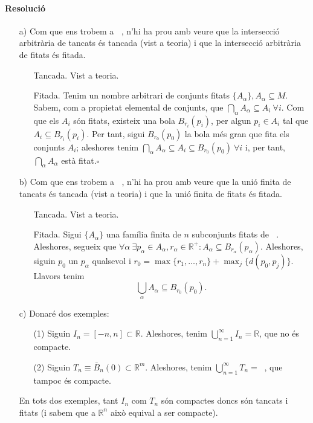 \documentclass[11pt]{article}
\DeclareMathOperator{\Rn}{\mathbb{R}^n}
\DeclareMathOperator{\Rm}{\mathbb{R}^m}
\DeclareMathOperator{\maxi}{max}
\begin{document}
\paragraph{Resolució}
\begin{itemize}
	\item[a)] Com que ens trobem a $\Rn$, n'hi ha prou amb veure que la intersecció arbitrària de tancats és tancada (vist a teoria) i que la intersecció arbitrària de fitats és fitada.
	\begin{itemize}
		\item[Tancada.] Vist a teoria.
		\item[Fitada.] Tenim un nombre arbitrari de conjunts fitats $\{A_{\alpha}\},A_{\alpha}\subseteq M$. Sabem, com a propietat elemental de conjunts, que $\bigcap_{\alpha}A_{\alpha}\subseteq A_i\ \forall i.$ Com que els $A_i$ són fitats, existeix una bola $B_{r_i}(p_i)$, per algun $p_i\in A_i$ tal que $A_i\subseteq B_{r_i}(p_i)$. Per tant, sigui $B_{r_0}(p_0)$ la bola més gran que fita els conjunts $A_i$; aleshores tenim $\bigcap_{\alpha}A_{\alpha}\subseteq A_i\subseteq B_{r_0}(p_0)\ \forall i$ i, per tant, $\bigcap_{\alpha}A_{\alpha}$ està fitat.$\square$
	\end{itemize}
	\item[b)] Com que ens trobem a $\Rn$, n'hi ha prou amb veure que la unió finita de tancats és tancada (vist a teoria) i que la unió finita de fitats és fitada.
	\begin{itemize}
		\item[Tancada.] Vist a teoria.
		\item[Fitada.] Sigui $\{A_{\alpha}\}$ una família finita de $n$ subconjunts fitats de $\Rn$. Aleshores, segueix que $\forall\alpha\ \exists p_{\alpha}\in A_{\alpha},r_{\alpha}\in\mathbb{R}^+:A_{\alpha}\subseteq B_{r_{\alpha}}(p_{\alpha})$. Aleshores, siguin $p_0$ un $p_{\alpha}$ qualsevol i $r_0=\maxi\{r_1,\ldots,r_n\}+\maxi_j\{d(p_0,p_j)\}$. Llavors tenim
		$$
		\bigcup_{\alpha}A_{\alpha}\subseteq B_{r_0}(p_0).
		$$
	\end{itemize}
	\item[c)] Donaré dos exemples:
	\begin{itemize}
		\item[(1)] Siguin $I_n=[-n,n]\subset\mathbb{R}$. Aleshores, tenim $\bigcup_{n=1}^{\infty}I_n=\mathbb{R}$, que no és compacte.
		\item[(2)] Siguin $T_n\equiv\bar{B}_n(0)\subset\mathbb{R}^m$. Aleshores, tenim $\bigcup_{n=1}^{\infty}T_n=\Rm$, que tampoc és compacte.
	\end{itemize}
	En tots dos exemples, tant $I_n$ com $T_n$ són compactes doncs són tancats i fitats (i sabem que a $\mathbb{R}^n$ això equival a ser compacte).
\end{itemize}
\end{document}
